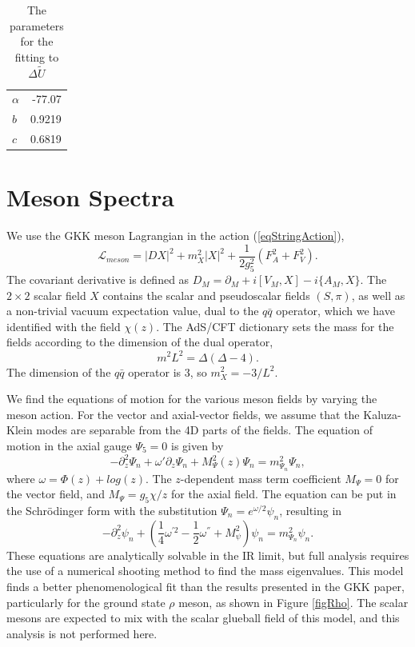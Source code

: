 \documentclass[12pt]{article}
\newcommand{\be}{\begin{equation}}
\newcommand{\ee}{\end{equation}}
\def\thalf{{\textstyle{\frac{1}{2}}}}
\def\oneqt{{\textstyle{\frac{1}{4}}}}
\newcommand{\cL}{\mathcal L}
\begin{document}
\begin{table}[htb]
\begin{center}
\label{tabFit}
\begin{tabular}{| l | r | }
\hline
$\alpha$ & -77.07  \\ %
$b$ & 0.9219  \\ %
$c$ & 0.6819\\ %
  \hline
\end{tabular}
\caption{The parameters for the fitting to $\Delta \tilde{U}$}
\end{center}
\end{table}

\section{Meson Spectra}

We use the GKK meson Lagrangian in the action (\ref{eqStringAction}),
\be
\cL_{meson}=\left|DX\right|^2+m_X^2\left|X\right|^2 +\frac{1}{2g_5^2}\left(F_A^2 +F_V^2\right).
\label{eqMesonL}
\ee
The covariant derivative is defined as $D_M = \partial_M+i[V_M,X]-i\{A_M,X\}$. The $2 \times 2$ scalar  field $X$ contains the scalar and pseudoscalar fields $(S,\pi)$, as well as a non-trivial vacuum expectation value, dual to the $q\bar{q}$ operator, which we have identified with the field $\chi(z)$.
The AdS/CFT dictionary sets the mass for the fields according to the dimension of the dual operator,
\be
m^2L^2=\Delta(\Delta-4).
\ee
The dimension of the $q\bar{q}$ operator is 3, so $m_X^2 = -3/L^2$.

We find the equations of motion for the various meson fields by varying the meson action.
For the vector and axial-vector fields, we  assume that the Kaluza-Klein modes are separable from the 4D parts of the fields.
The equation of motion in the axial gauge $\Psi_5=0$  is given by
\be
-\partial_z^2\Psi_n+\omega'\partial_z\Psi_n +M_\Psi^2(z) \Psi_n=m^2_{\Psi_n}\Psi_n,
\ee
where $\omega=\Phi(z)+log(z)$. 
The $z$-dependent mass term coefficient $M_\Psi=0$  for the vector field, and $M_\Psi=g_5\chi/z$ for the axial field.
The equation can be put in the Schr{\"o}dinger form with the substitution $\Psi_n=e^{\omega/2}\psi_n$, resulting in
\be
-\partial^2_z\psi_n+\left(\oneqt \omega^{'2}-\thalf\omega^{''}+M_\psi^2\right)\psi_n=m^2_{\Psi_n}\psi_n.
\ee
These equations are analytically solvable in the IR limit, but full analysis requires the use of a numerical shooting method to find the mass eigenvalues.
This model finds a better phenomenological fit than the results presented in the GKK paper, particularly for the ground state $\rho$ meson, as shown in Figure \ref{figRho}. 
The scalar mesons are expected to mix with the scalar glueball field of this model, and this analysis is not performed here. 
\end{document}
